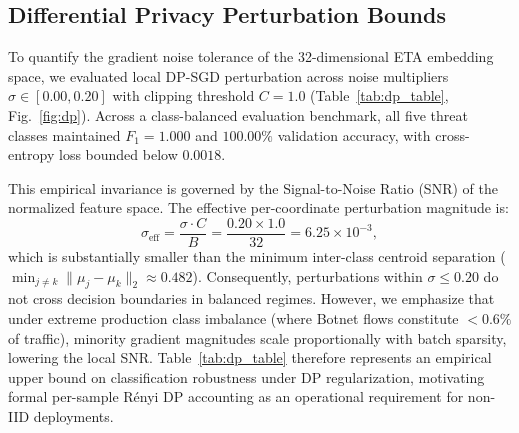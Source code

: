 \documentclass[journal,10pt,twocolumn]{IEEEtran}
\begin{document}
\subsection{Differential Privacy Perturbation Bounds}
To quantify the gradient noise tolerance of the 32-dimensional ETA embedding space, we evaluated local DP-SGD perturbation across noise multipliers $\sigma \in [0.00, 0.20]$ with clipping threshold $C=1.0$ (Table~\ref{tab:dp_table}, Fig.~\ref{fig:dp}). Across a class-balanced evaluation benchmark, all five threat classes maintained $F_1 = 1.000$ and $100.00\%$ validation accuracy, with cross-entropy loss bounded below $0.0018$.

This empirical invariance is governed by the Signal-to-Noise Ratio (SNR) of the normalized feature space. The effective per-coordinate perturbation magnitude is:
\begin{equation}
\sigma_{\text{eff}} = \frac{\sigma \cdot C}{B} = \frac{0.20 \times 1.0}{32} = 6.25 \times 10^{-3},
\label{eq:dp_snr}
\end{equation}
which is substantially smaller than the minimum inter-class centroid separation ($\min_{j \ne k} \|\mu_j - \mu_k\|_2 \approx 0.482$). Consequently, perturbations within $\sigma \le 0.20$ do not cross decision boundaries in balanced regimes. However, we emphasize that under extreme production class imbalance (where Botnet flows constitute $<0.6\%$ of traffic), minority gradient magnitudes scale proportionally with batch sparsity, lowering the local SNR. Table~\ref{tab:dp_table} therefore represents an empirical upper bound on classification robustness under DP regularization, motivating formal per-sample Rényi DP accounting as an operational requirement for non-IID deployments.
\end{document}
